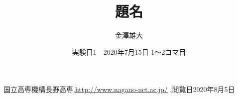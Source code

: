\documentclass[a4j]{jarticle}
\title{題名}
\date{実験日1　2020年7月15日 1～2コマ目}
\author{金澤雄大}
\begin{document}
    \maketitle
    \thispagestyle{empty}
    \clearpage
    \addtocounter{page}{-1}

        \begin{thebibliography}{9}
            国立高専機構長野高専,\url{http://www.nagano-nct.ac.jp/} ,閲覧日2020年8月5日
          \end{thebibliography}
\end{document}
